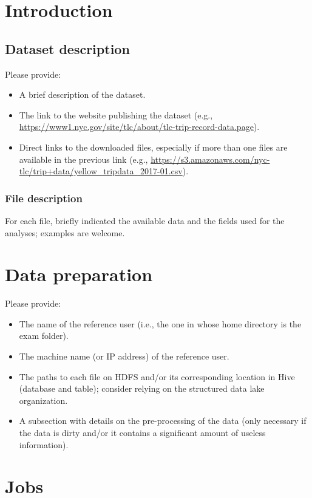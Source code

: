 \documentclass[10pt]{article}
\begin{document}
\section{Introduction}
\subsection{Dataset description}

Please provide:
\begin{itemize}
\item A brief description of the dataset.
\item The link to the website publishing the dataset (e.g., \url{https://www1.nyc.gov/site/tlc/about/tlc-trip-record-data.page}).
\item Direct links to the downloaded files, especially if more than one files are available in the previous link (e.g., \url{https://s3.amazonaws.com/nyc-tlc/trip+data/yellow_tripdata_2017-01.csv}).
\end{itemize}

\subsubsection{File description}

For each file, briefly indicated the available data and the fields used for the analyses; examples are welcome.


\section{Data preparation}

Please provide:
\begin{itemize}
\item The name of the reference user (i.e., the one in whose home directory is the {\sf exam} folder).
\item The machine name (or IP address) of the reference user.
\item The paths to each file on HDFS and/or its corresponding location in Hive (database and table); consider relying on the structured data lake organization.
\item A subsection with details on the pre-processing of the data (only necessary if the data is dirty and/or it contains a significant amount of useless information).
\end{itemize}


\section{Jobs}
\end{document}
